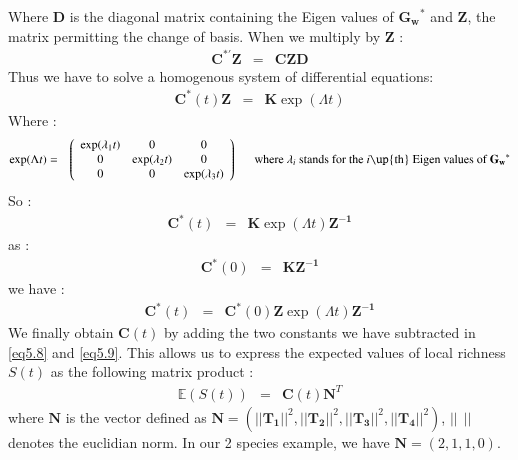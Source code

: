 Where $\mathbf{D}$ is the diagonal matrix containing the Eigen values of $\mathbf{G_w}^*$ and $\mathbf{Z}$, the matrix permitting the change of basis. When we multiply by $\mathbf{Z}$ :
\begin{eqnarray}
\mathbf{C}^{*'}\mathbf{Z}&=&\mathbf{CZD}
\end{eqnarray}
Thus we have to solve a homogenous system of differential equations:
\begin{eqnarray}
\mathbf{C}^{*}(t)\mathbf{Z}&=&\mathbf{K}\exp(\Lambda t)
\end{eqnarray}
Where :
\begin{eqnarray}
\nonumber \exp(\Lambda t)&=&
\left(\begin{array}{cccc}
\exp(\lambda_1t) & 0 & 0 \\
0 & \exp(\lambda_2t) & 0  \\
0  & 0 & \exp(\lambda_3t)
\end{array}\right)
\text{ ~~~~ where $\lambda_i$ stands for the $i$\up{th} Eigen values of $\mathbf{G_w}^*$}
\end{eqnarray}
So :
\begin{eqnarray}
\mathbf{C}^{*}(t)&=&\mathbf{K}\exp(\Lambda t)\mathbf{Z^{-1}}
\end{eqnarray}
as :
\begin{eqnarray}
\mathbf{C}^{*}(0)&=&\mathbf{KZ^{-1}}
\end{eqnarray}
we have :
\begin{eqnarray}
\mathbf{C}^{*}(t)&=&\mathbf{C}^{*}(0)\mathbf{Z}\exp(\Lambda t)\mathbf{Z^{-1}}
\end{eqnarray}
We finally obtain $\mathbf{C}(t)$ by adding the two constants we have subtracted in \eqref{eq5.8} and \eqref{eq5.9}. This allows us to express the expected values of local richness $S(t)$ as the following matrix product :
\begin{eqnarray}
\label{eq5.19} \mathbb{E}({S}(t))&=&\mathbf{C}(t)\mathbf{N}^T
\end{eqnarray}
where $\mathbf{N}$ is the vector defined as  $\mathbf{N}=(||\mathbf{T_1}||^2, ||\mathbf{T_2}||^2, ||\mathbf{T_3}||^2, ||\mathbf{T_4}||^2)$, $||~~||$ denotes the euclidian norm. In our 2 species example, we have $\mathbf{N}=(2,1,1,0)$.


